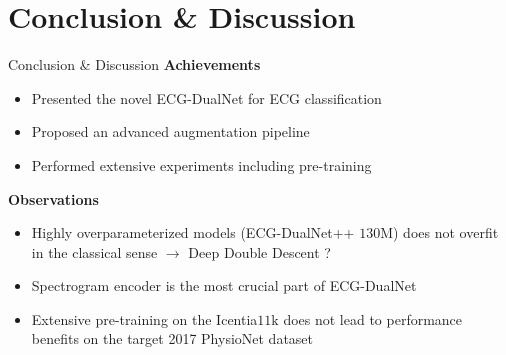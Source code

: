\section{Conclusion \& Discussion}
\begin{frame}{Conclusion \& Discussion}
    \textbf{Achievements}
    \begin{itemize}
        \item Presented the novel ECG-DualNet for ECG classification
        \item Proposed an advanced augmentation pipeline
        \item Performed extensive experiments including pre-training
    \end{itemize}
    \pause
    \textbf{Observations}
    \begin{itemize}
        \item Highly overparameterized models (ECG-DualNet++ $130\si{\mega}$) does not overfit in the classical sense $\to$ Deep Double Descent \cite{Nakkiran2020} ?
        \item Spectrogram encoder is the most crucial part of ECG-DualNet
        \item Extensive pre-training on the Icentia$11\si{\kilo}$ does not lead to performance benefits on the target 2017 PhysioNet dataset
    \end{itemize}
\end{frame}